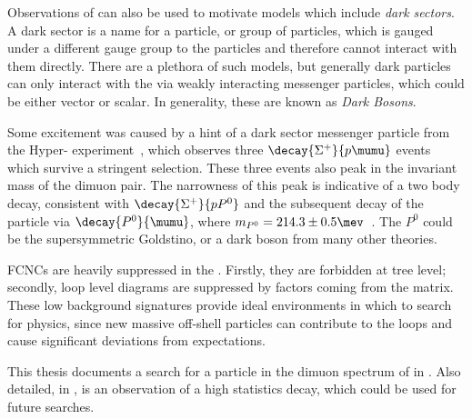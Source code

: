 Observations of \dm can also be used to motivate \bsm models which include \emph{dark sectors}.
A dark sector is a name for a particle, or group of particles, which is gauged under a
different gauge group to the \sm particles and therefore cannot interact with them directly.
There are a plethora of such models, but generally dark particles can only interact with the \sm
via weakly interacting messenger particles, which could be either vector or scalar.
In generality, these are known as \emph{Dark Bosons}.

Some excitement was caused by a hint of a dark sector messenger particle from the Hyper-\CP
experiment~\cite{Burnstein:2004uk}, which observes three $\decay{\Sigma^+}{p\mumu}$ events which
survive a stringent selection.
These three events also peak in the invariant mass of the dimuon pair.
The narrowness of this peak is indicative of a two body decay, consistent with  $\decay{\Sigma^+}{pP^0}$
and the subsequent decay of the \np particle via $\decay{P^0}{\mumu}$, where
$m_{P^0}=214.3\pm0.5\mev$~\cite{Park:2005eka}.
The $P^0$ could be the supersymmetric Goldstino, or a dark boson from many other theories.

\glspl{FCNC} are heavily suppressed in the \sm.
Firstly, they are forbidden at tree level; secondly, loop level diagrams are suppressed by factors
coming from the \ckm matrix.
These low background signatures provide ideal environments in which to search for \bsm physics,
since new massive off-shell particles can contribute to the loops and cause significant deviations
from \sm expectations.

This thesis documents a search for a \np particle in the dimuon spectrum of \btokstrmumu in
.
Also detailed, in , is an observation of a high statistics \fcnc decay,
which could be used for future \np searches.












